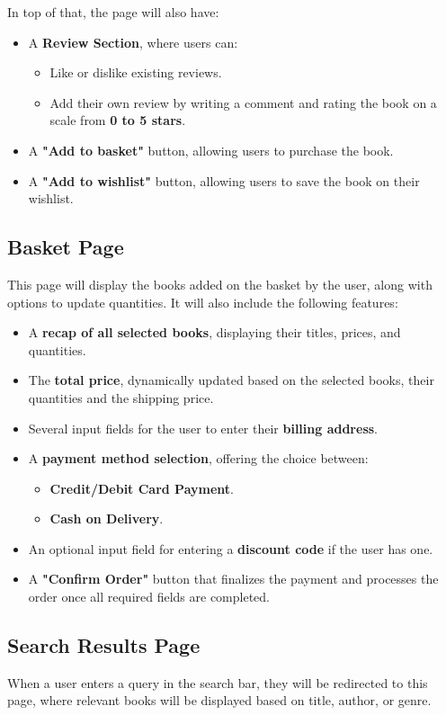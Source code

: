 In top of that, the page will also have:
\begin{itemize}
    \item A \textbf{Review Section}, where users can:
    \begin{itemize}
        \item Like or dislike existing reviews.
        \item Add their own review by writing a comment and rating the book on a scale from \textbf{0 to 5 stars}.
    \end{itemize}
    \item A \textbf{"Add to basket"} button, allowing users to purchase the book.
    \item A \textbf{"Add to wishlist"} button, allowing users to save the book on their wishlist.
\end{itemize}

\subsection{Basket Page} \label{sec:basket}
This page will display the books added on the basket by the user, along with options to update quantities. It will also include the following features:

\begin{itemize}
    \item A \textbf{recap of all selected books}, displaying their titles, prices, and quantities.
    \item The \textbf{total price}, dynamically updated based on the selected books, their quantities and the shipping price.
    \item Several input fields for the user to enter their \textbf{billing address}.
    \item A \textbf{payment method selection}, offering the choice between:
    \begin{itemize}
        \item \textbf{Credit/Debit Card Payment}.
        \item \textbf{Cash on Delivery}.
    \end{itemize}
    \item An optional input field for entering a \textbf{discount code} if the user has one.
    \item A \textbf{"Confirm Order"} button that finalizes the payment and processes the order once all required fields are completed.
\end{itemize}

\subsection{Search Results Page} \label{sec:search}
When a user enters a query in the search bar, they will be redirected to this page, where relevant books will be displayed based on title, author, or genre.

